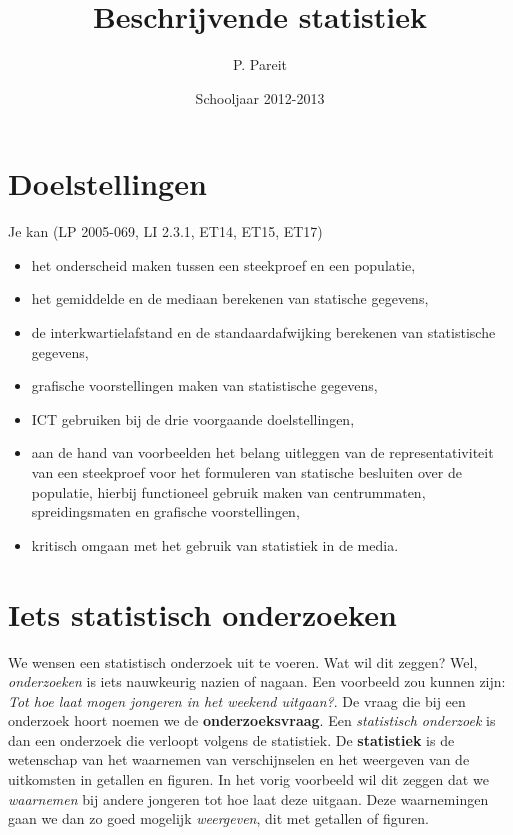 \documentclass[11pt]{article}
\title{\Huge Beschrijvende statistiek}
\author{P. Pareit}
\date{Schooljaar 2012-2013}
\begin{document}
\maketitle
\vspace*{0cm}
\lhead{}

\section{Doelstellingen}
Je kan \hfill (LP 2005-069, LI 2.3.1, ET14, ET15, ET17)
\begin{itemize}
  \item het onderscheid maken tussen een steekproef en een populatie,
  \item het gemiddelde en de mediaan berekenen van statische gegevens,
  \item de interkwartielafstand en de standaardafwijking berekenen van statistische gegevens,
  \item grafische voorstellingen maken van statistische gegevens,
  \item ICT gebruiken bij de drie voorgaande doelstellingen,
  \item aan de hand van voorbeelden het belang uitleggen van de representativiteit van een steekproef voor het formuleren van statische besluiten over de populatie, hierbij functioneel gebruik maken van centrummaten, spreidingsmaten en grafische voorstellingen,
  \item kritisch omgaan met het gebruik van statistiek in de media.
\end{itemize}

\section{Iets statistisch onderzoeken}

We wensen een statistisch onderzoek uit te voeren. Wat wil dit zeggen? Wel, {\it onderzoeken} is iets nauwkeurig nazien of nagaan. Een voorbeeld zou kunnen zijn: {\it Tot hoe laat mogen jongeren in het weekend uitgaan?}. De vraag die bij een onderzoek hoort noemen we de {\bf onderzoeksvraag}. Een {\it statistisch onderzoek} is dan een onderzoek die verloopt volgens de statistiek. De {\bf statistiek} is de wetenschap van het waarnemen van verschijnselen en het weergeven van de uitkomsten in getallen en figuren. In het vorig voorbeeld wil dit zeggen dat we {\it waarnemen} bij andere jongeren tot hoe laat deze uitgaan. Deze waarnemingen gaan we dan zo goed mogelijk {\it weergeven}, dit met getallen of figuren.
\end{document}
